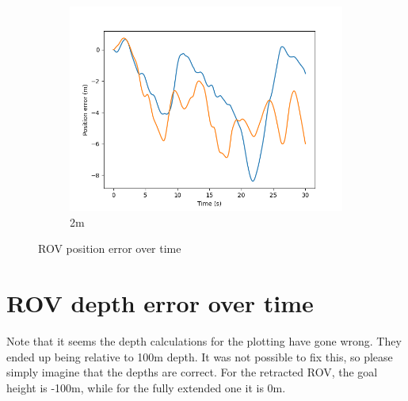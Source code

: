 \documentclass[class=article, crop=false]{standalone}
\begin{document}
\begin{figure}
\begin{subfigure}[b]{0.48\textwidth}
        \includegraphics{scenario1/rov-100m/2.0m/rov_position_error_controlled}
        \caption{2m}
        \label{}
    \end{subfigure}

    \caption{ROV position error over time}
\end{figure}

\section{ROV depth error over time}
Note that it seems the depth calculations for the plotting have gone wrong. They ended up being relative to 100m depth. It was not possible to fix this, so please simply imagine that the depths are correct. For the retracted ROV, the goal height is -100m, while for the fully extended one it is 0m.
\end{document}

